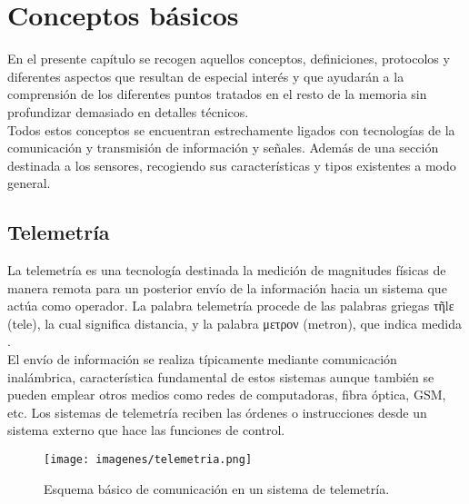 
\newpage

\chapter{Conceptos básicos}
\label{chap:conceptos-básicos}


En el presente capítulo se recogen aquellos conceptos, definiciones, protocolos y diferentes aspectos que resultan de especial interés y que ayudarán a la comprensión de los diferentes puntos tratados en el resto de 
la memoria sin profundizar demasiado en detalles técnicos.\\

Todos estos conceptos se encuentran estrechamente ligados con tecnologías de la comunicación y transmisión de información y señales. Además de una sección destinada a los sensores, recogiendo sus 
características y tipos existentes a modo general.\\


\section{Telemetría}
\label{def:telemetria}

La telemetría es una tecnología destinada la medición de magnitudes físicas de manera remota para un posterior envío de la información hacia un sistema que actúa como operador. La palabra telemetría
procede de las palabras griegas τῆlε (tele), la cual significa distancia, y la palabra μετρον (metron), que indica medida \cite{book:telemetria}.\\

El envío de información se realiza típicamente mediante comunicación inalámbrica, característica fundamental de estos sistemas aunque también se pueden emplear otros medios 
como redes de computadoras, fibra óptica, GSM, etc. Los sistemas de telemetría reciben las órdenes o instrucciones desde un sistema externo que hace las 
funciones de control.\\


\begin{figure}[H]
  \begin{center}
    \texttt{[image: imagenes/telemetria.png]}
  \end{center}
  \label{fig:telemetria}
 \caption{Esquema básico de comunicación en un sistema de telemetría.}
\end{figure}



